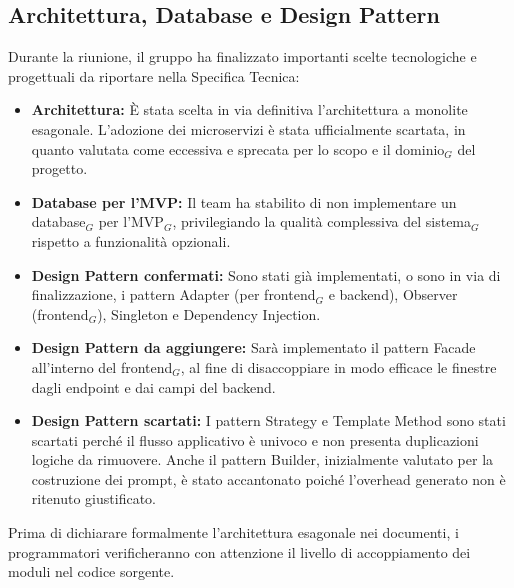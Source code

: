 \documentclass[a4paper, 10pt, colorlinks=true, linkcolor=black, urlcolor=blue, citecolor=blue, hidelinks]{article}
\begin{document}
\subsection{Architettura, Database e Design Pattern}
Durante la riunione, il gruppo ha finalizzato importanti scelte tecnologiche e progettuali da riportare nella Specifica Tecnica:
\begin{itemize}
    \item \textbf{Architettura:} È stata scelta in via definitiva l'architettura a monolite esagonale. L'adozione dei microservizi è stata ufficialmente scartata, in quanto valutata come eccessiva e sprecata per lo scopo e il dominio$_G$ del progetto.
    \item \textbf{Database per l'MVP:} Il team ha stabilito di non implementare un database$_G$ per l'MVP$_G$, privilegiando la qualità complessiva del sistema$_G$ rispetto a funzionalità opzionali.
    \item \textbf{Design Pattern confermati:} Sono stati già implementati, o sono in via di finalizzazione, i pattern Adapter (per frontend$_G$ e backend), Observer (frontend$_G$), Singleton e Dependency Injection.
    \item \textbf{Design Pattern da aggiungere:} Sarà implementato il pattern Facade all'interno del frontend$_G$, al fine di disaccoppiare in modo efficace le finestre dagli endpoint e dai campi del backend.
    \item \textbf{Design Pattern scartati:} I pattern Strategy e Template Method sono stati scartati perché il flusso applicativo è univoco e non presenta duplicazioni logiche da rimuovere. Anche il pattern Builder, inizialmente valutato per la costruzione dei prompt, è stato accantonato poiché l'overhead generato non è ritenuto giustificato.
\end{itemize}
Prima di dichiarare formalmente l'architettura esagonale nei documenti, i programmatori verificheranno con attenzione il livello di accoppiamento dei moduli nel codice sorgente.
\end{document}
